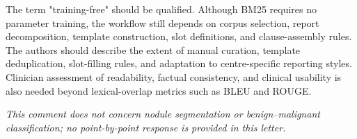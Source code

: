 \begin{reviewercomment}
The term "training-free" should be qualified. Although BM25 requires no parameter training, the workflow still depends on corpus selection, report decomposition, template construction, slot definitions, and clause-assembly rules. The authors should describe the extent of manual curation, template deduplication, slot-filling rules, and adaptation to centre-specific reporting styles. Clinician assessment of readability, factual consistency, and clinical usability is also needed beyond lexical-overlap metrics such as BLEU and ROUGE.
\end{reviewercomment}
\begin{authorresponse}
\noindent\textit{This comment does not concern nodule segmentation or benign--malignant classification; no point-by-point response is provided in this letter.}
\end{authorresponse}

